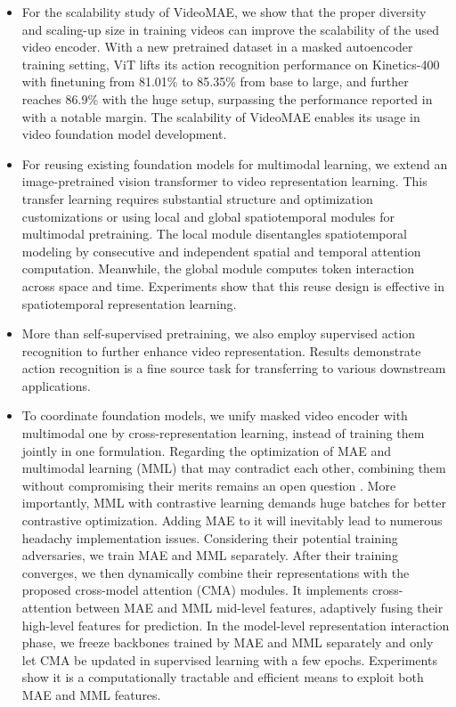 \begin{itemize}[leftmargin=*]
	
	\item For the scalability study of VideoMAE, we show that the proper diversity and scaling-up size in training videos can improve the scalability of the used video encoder. With a new pretrained dataset in a masked autoencoder training setting, ViT lifts its action recognition performance on Kinetics-400 \cite{k400} with finetuning from 81.01\% to 85.35\% from base to large, and further reaches 86.9\% with the huge setup, surpassing the performance reported in \cite{videomae} with a notable margin. The scalability of VideoMAE enables its usage in video foundation model development.
	
	\item For reusing existing foundation models for multimodal learning, we extend an image-pretrained vision transformer \cite{dosovitskiy2020image} to video representation learning. This transfer learning requires substantial structure and optimization customizations or using local and global spatiotemporal modules for multimodal pretraining. The local module disentangles spatiotemporal modeling by consecutive and independent spatial and temporal attention computation. Meanwhile, the global module computes token interaction across space and time. Experiments show that this reuse design is effective in spatiotemporal representation learning.
	
	\item More than self-supervised pretraining, we also employ supervised action recognition to further enhance video representation. Results demonstrate action recognition is a fine source task for transferring to various downstream applications.
	
	\item To coordinate foundation models, we unify masked video encoder with multimodal one by cross-representation learning, instead of training them jointly in one formulation. Regarding the optimization of MAE and multimodal learning (MML) that may contradict each other, combining them without compromising their merits remains an open question \cite{bachmann2022multimae}. More importantly, MML with contrastive learning demands huge batches for better contrastive optimization. Adding MAE to it will inevitably lead to numerous headachy implementation issues. Considering their potential training adversaries, we train MAE and MML separately. After their training converges, we then dynamically combine their representations with the proposed cross-model attention (CMA) modules. It implements cross-attention between MAE and MML mid-level features, adaptively fusing their high-level features for prediction. In the model-level representation interaction phase, we freeze backbones trained by MAE and MML separately and only let CMA be updated in supervised learning with a few epochs. Experiments show it is a computationally tractable and efficient means to exploit both MAE and MML features. 
\end{itemize}

